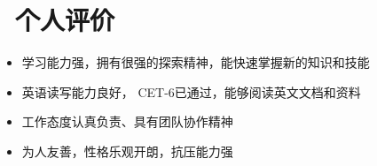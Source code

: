\documentclass{resume}
\begin{document}


\section{\faInfo\ 个人评价}
\begin{itemize}[parsep=0.5ex]
  \item 学习能力强，拥有很强的探索精神，能快速掌握新的知识和技能
  \item 英语读写能力良好， CET-6已通过，能够阅读英文文档和资料
  \item 工作态度认真负责、具有团队协作精神
  \item 为人友善，性格乐观开朗，抗压能力强
\end{itemize}

%
%
\end{document}
